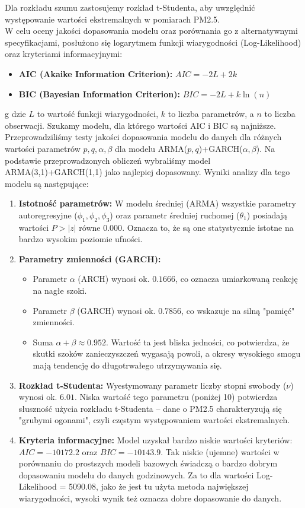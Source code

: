 \documentclass{article}
\begin{document}
Dla rozkładu szumu zastosujemy rozkład t-Studenta, aby uwzględnić występowanie wartości ekstremalnych w pomiarach PM2.5. \\

W celu oceny jakości dopasowania modelu oraz porównania go z alternatywnymi specyfikacjami, posłużono się logarytmem funkcji wiarygodności (Log-Likelihood) oraz kryteriami informacyjnymi:
\begin{itemize}
\item \textbf{AIC (Akaike Information Criterion):} $AIC = -2L + 2k$
\item \textbf{BIC (Bayesian Information Criterion):} $BIC = -2L + k \ln(n)$
\end{itemize}g
dzie $L$ to wartość funkcji wiarygodności, $k$ to liczba parametrów, a $n$ to liczba obserwacji. Szukamy modelu, dla którego wartości AIC i BIC są najniższe. \\

Przeprowadziliśmy testy jakości dopasowania modelu do danych dla różnych wartości parametrów $p, q, \alpha, \beta$ dla modelu ARMA($p,q$)+GARCH($\alpha, \beta$). Na podstawie przeprowadzonych obliczeń wybraliśmy model ARMA(3,1)+GARCH(1,1) jako najlepiej dopasowany. Wyniki analizy dla tego modelu są następujące:
\begin{enumerate}
\item \textbf{Istotność parametrów:} W modelu średniej (ARMA) wszystkie parametry autoregresyjne ($\phi_1, \phi_2, \phi_3$) oraz parametr średniej ruchomej ($\theta_1$) posiadają wartości $P>|z|$ równe $0.000$. Oznacza to, że są one statystycznie istotne na bardzo wysokim poziomie ufności.
\item \textbf{Parametry zmienności (GARCH):}
\begin{itemize}
\item Parametr $\alpha$ (ARCH) wynosi ok. $0.1666$, co oznacza umiarkowaną reakcję na nagłe szoki.
\item Parametr $\beta$ (GARCH) wynosi ok. $0.7856$, co wskazuje na silną "pamięć" zmienności.
\item Suma $\alpha + \beta \approx 0.952$. Wartość ta jest bliska jedności, co potwierdza, że skutki szoków zanieczyszczeń wygasają powoli, a okresy wysokiego smogu mają tendencję do długotrwałego utrzymywania się.
\end{itemize}
\item \textbf{Rozkład t-Studenta:} Wyestymowany parametr liczby stopni swobody ($\nu$) wynosi ok. $6.01$. Niska wartość tego parametru (poniżej 10) potwierdza słuszność użycia rozkładu t-Studenta – dane o PM2.5 charakteryzują się "grubymi ogonami", czyli częstym występowaniem wartości ekstremalnych.
\item \textbf{Kryteria informacyjne:} Model uzyskał bardzo niskie wartości kryteriów: $AIC = -10172.2$ oraz $BIC = -10143.9$. Tak niskie (ujemne) wartości w porównaniu do prostszych modeli bazowych świadczą o bardzo dobrym dopasowaniu modelu do danych godzinowych. Za to dla wartości Log-Likelihood = 5090.08, jako że jest tu użyta metoda największej wiarygodności, wysoki wynik też oznacza dobre dopasowanie do danych. 
\end{enumerate}
\end{document}
